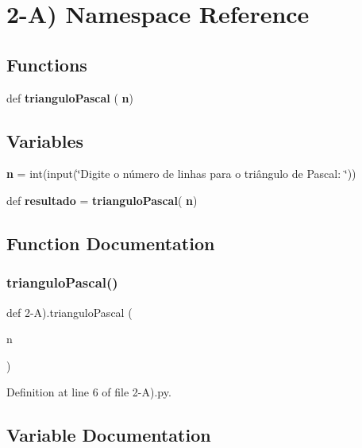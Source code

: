 \section{2-\/A) Namespace Reference}
\label{namespace2-_a_08}
\subsection*{Functions}
\begin{DoxyCompactItemize}
\item 
def \textbf{ triangulo\+Pascal} (\textbf{ n})
\end{DoxyCompactItemize}
\subsection*{Variables}
\begin{DoxyCompactItemize}
\item 
\textbf{ n} = int(input(\char`\"{}Digite o número de linhas para o triângulo de Pascal\+: \char`\"{}))
\item 
def \textbf{ resultado} = \textbf{ triangulo\+Pascal}(\textbf{ n})
\end{DoxyCompactItemize}


\subsection{Function Documentation}
\mbox{\label{namespace2-_a_08_a8c79102d76eeb60031412e22ad316f87}} 
\subsubsection{trianguloPascal()}
{\footnotesize\ttfamily def 2-\/A).triangulo\+Pascal (\begin{DoxyParamCaption}\item[{}]{n }\end{DoxyParamCaption})}



Definition at line 6 of file 2-\/\+A).\+py.



\subsection{Variable Documentation}
\mbox{\label{namespace2-_a_08_a178d616337e068de8775e52e1aa3ad0e}} 
